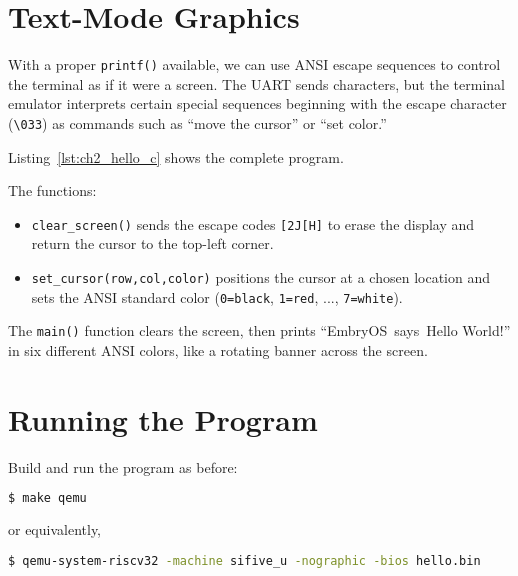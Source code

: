 \section{Text-Mode Graphics}

With a proper \texttt{printf()} available, we can use ANSI escape sequences to
control the terminal as if it were a screen.  The UART sends characters, but
the terminal emulator interprets certain special sequences beginning with the
escape character (\texttt{\textbackslash033}) as commands such as ``move the
cursor'' or ``set color.''

Listing~\ref{lst:ch2_hello_c} shows the complete program.

\begin{figure}[H]
\centering
\begin{minipage}{0.9\textwidth}

\end{minipage}
\end{figure}

The functions:

\begin{itemize}
  \item \texttt{clear\_screen()} sends the escape codes
        \texttt{[2J[H]} to erase the display and return the cursor to the
        top-left corner.
  \item \texttt{set\_cursor(row,col,color)} positions the cursor at a chosen location and sets the ANSI standard color (\texttt{0=black}, \texttt{1=red}, $...$, \texttt{7=white}).
\end{itemize}

The \texttt{main()} function clears the screen, then prints
``EmbryOS~says~Hello World!'' in six different ANSI colors,
like a rotating banner across the screen.

\section{Running the Program}

Build and run the program as before:

\begin{lstlisting}[style=oscode,language=bash]
$ make qemu
\end{lstlisting}

or equivalently,

\begin{lstlisting}[style=oscode,language=bash]
$ qemu-system-riscv32 -machine sifive_u -nographic -bios hello.bin
\end{lstlisting}

